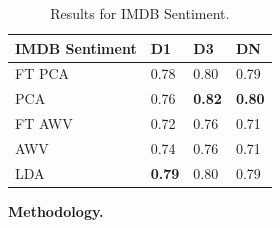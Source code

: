 \begin{table}[t]
	\centering
	\setlength{\tabcolsep}{10pt}
	\begin{tabularx}{\columnwidth}{llll}
		\toprule
		\textbf{IMDB Sentiment} & D1   & D3   & DN   \\
		\midrule
		FT PCA         & 0.78 & 0.80 & 0.79 \\
		PCA            & 0.76 & \textbf{0.82} & \textbf{0.80} \\
		FT AWV         & 0.72 & 0.76 & 0.71 \\
		AWV            & 0.74 & 0.76 & 0.71 \\
		LDA            & \textbf{0.79} & 0.80 & 0.79 \\
		\bottomrule
	\end{tabularx}
	\caption{Results for IMDB Sentiment. \label{tabSentiment}}
	
\end{table}

 




\noindent \textbf{Methodology.} %

